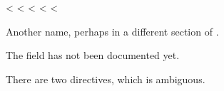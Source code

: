 \documentclass[letterpaper,10pt,english]{sphinxmanual}
\begin{document}
\begin{fulllineitems}
\label{\detokenize{index:tconf-tool.something.name}}
<%
\pysigstartsignatures
<%
<%
<%
\pysigstopsignatures<%
\vspace{-45px}

\begin{DUlineblock}{0em}
\item[]  
\item[]  
\end{DUlineblock}

\vspace{-25px}

Another name, perhaps in a different section of .

\end{fulllineitems}


The  field has not been documented yet.

There are two {\hyperref[\detokenize{index:tconf-project.name}]{}} directives, which is ambiguous.



\renewcommand{\indexname}{Index}
\printindex
\end{document}
